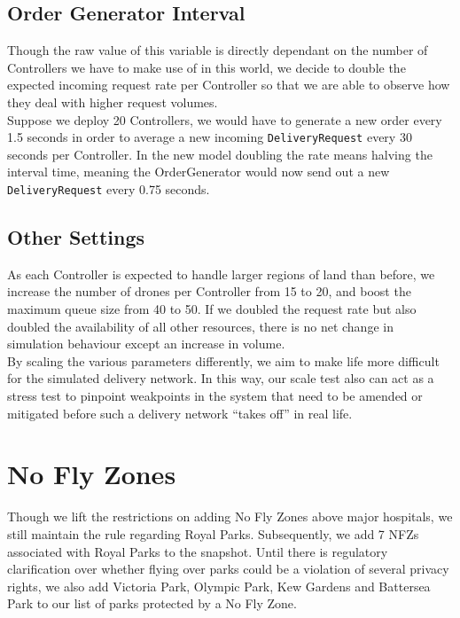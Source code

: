 \documentclass[a4paper,11pt,titlepage]{report}
\begin{document}
\subsection{Order Generator Interval}
Though the raw value of this variable is directly dependant on the number of Controllers we have to make use of in this world, we decide to double the expected incoming request rate per Controller so that we are able to observe how they deal with higher request volumes.\\

Suppose we deploy 20 Controllers, we would have to generate a new order every 1.5 seconds in order to average a new incoming \texttt{DeliveryRequest} every 30 seconds per Controller. In the new model doubling the rate means halving the interval time, meaning the OrderGenerator would now send out a new \texttt{DeliveryRequest} every 0.75 seconds.

\subsection{Other Settings}
As each Controller is expected to handle larger regions of land than before, we increase the number of drones per Controller from 15 to 20, and boost the maximum queue size from 40 to 50. If we doubled the request rate but also doubled the availability of all other resources, there is no net change in simulation behaviour except an increase in volume.\\

By scaling the various parameters differently, we aim to make life more difficult for the simulated delivery network. In this way, our scale test also can act as a stress test to pinpoint weakpoints in the system that need to be amended or mitigated before such a delivery network ``takes off'' in real life.

\section{No Fly Zones}
Though we lift the restrictions on adding No Fly Zones above major hospitals, we still maintain the rule regarding Royal Parks. Subsequently, we add 7 NFZs associated with Royal Parks to the snapshot. Until there is regulatory clarification over whether flying over parks could be a violation of several privacy rights, we also add Victoria Park, Olympic Park, Kew Gardens and Battersea Park to our list of parks protected by a No Fly Zone.\\
\end{document}
